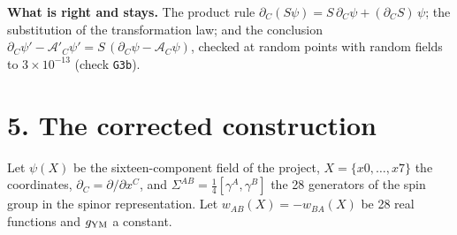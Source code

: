 \documentclass[
  10pt,
]{article}
\begin{document}
\textbf{What is right and stays.} The product rule
\(\partial_C(S\psi)=S\,\partial_C\psi+(\partial_CS)\,\psi\); the
substitution of the transformation law; and the conclusion
\(\partial_C\psi'-\mathcal A'_C\psi'=S\,(\partial_C\psi-\mathcal A_C\psi)\),
checked at random points with random fields to \(3\times10^{-13}\)
(check \texttt{G3b}).

\hypertarget{the-corrected-construction}{%
\section{5. The corrected
construction}\label{the-corrected-construction}}

Let \(\psi(X)\) be the sixteen-component field of the project,
\(X=\{x0,\dots,x7\}\) the coordinates,
\(\partial_C=\partial/\partial x^C\), and
\(\Sigma^{AB}=\tfrac14[\gamma^A,\gamma^B]\) the 28 generators of the
spin group in the spinor representation. Let \(w_{AB}(X)=-w_{BA}(X)\) be
28 real functions and \(g_{\rm YM}\) a constant.
\end{document}
